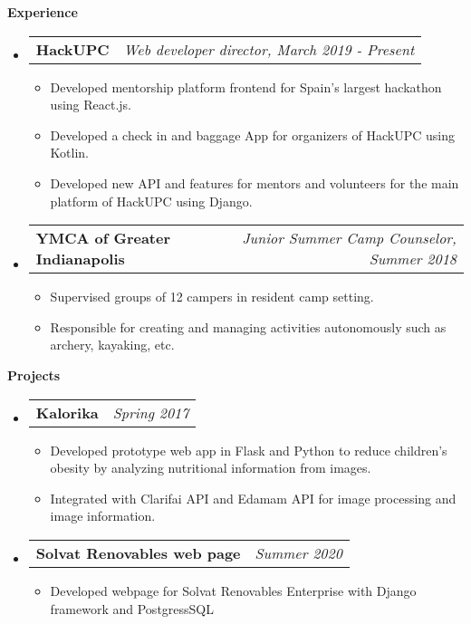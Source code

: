 \documentclass[letterpaper,12pt]{article}
\makeatletter
\newcommand{\resitem}[1]{\item #1 \vspace{-2pt}}
\newcommand{\resheading}[1]{{\large \colorbox{mygrey}{\begin{minipage}{\textwidth}{\textbf{#1 \vphantom{p\^{E}}}}\end{minipage}}}}
\newcommand{\ressubheading}[4]{
\begin{tabular*}{7.0in}{l@{\extracolsep{\fill}}r}
		\textbf{#1} & \textit{#4} \\
\end{tabular*}\vspace{-6pt}}
\makeatother
\begin{document}
\resheading{Experience}
	\begin{itemize}
		\item
			\ressubheading{HackUPC}{Barcelona, Spain}{Web developer}{Web developer director, March 2019 - Present}
			\begin{itemize}
				\resitem{Developed mentorship platform frontend for Spain's largest hackathon using React.js.}
				\resitem{Developed a check in and baggage App for organizers of HackUPC using Kotlin.}
				\resitem{Developed new API and features for mentors and volunteers for the main platform of HackUPC using Django.}
			\end{itemize}
		\item
			\ressubheading{YMCA of Greater Indianapolis}{St. Paul, IN}{Junior Summer Camp Counselor}{Junior Summer Camp Counselor, Summer 2018}
			\begin{itemize}
				\resitem{Supervised groups of 12 campers in resident camp setting.}
				\resitem{Responsible for creating and managing activities autonomously such as archery, kayaking, etc.}
			\end{itemize}

	\end{itemize}

\resheading{Projects}
	\begin{itemize}
		\item
			\ressubheading{Kalorika}{Barcelona, Spain}{Student}{Spring 2017}
			\begin{itemize}
				\resitem{Developed prototype web app in Flask and Python to reduce children's obesity by analyzing nutritional information from images.}
				\resitem{Integrated with Clarifai API and Edamam API for image processing and image information.}
			\end{itemize}
		\item
			\ressubheading{Solvat Renovables web page}{Barcelona, Spain}{Student}{Summer 2020}
			\begin{itemize}
				\resitem{Developed webpage for Solvat Renovables Enterprise with Django framework and PostgressSQL}
			\end{itemize}
	\end{itemize}
\end{document}
